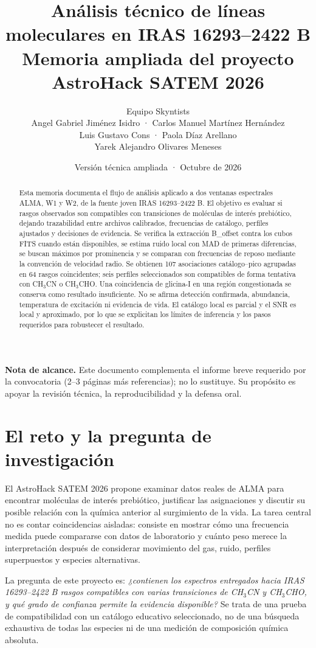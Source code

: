 \documentclass[10pt]{article}
\title{\vspace{-1.3em}\textbf{Análisis técnico de líneas moleculares en IRAS 16293--2422 B}\\[.35em]
\large Memoria ampliada del proyecto AstroHack SATEM 2026}
\author{Equipo Skyntists\\Angel Gabriel Jiménez Isidro · Carlos Manuel Martínez Hernández\\Luis Gustavo Cons · Paola Díaz Arellano\\\small Yarek Alejandro Olivares Meneses}
\date{Versión técnica ampliada · Octubre de 2026}
\begin{document}
\maketitle
\begin{abstract}
Esta memoria documenta el flujo de análisis aplicado a dos ventanas espectrales ALMA, W1 y W2, de la fuente joven IRAS 16293--2422 B. El objetivo es evaluar si rasgos observados son compatibles con transiciones de moléculas de interés prebiótico, dejando trazabilidad entre archivos calibrados, frecuencias de catálogo, perfiles ajustados y decisiones de evidencia. Se verifica la extracción B\_offset contra los cubos FITS cuando están disponibles, se estima ruido local con MAD de primeras diferencias, se buscan máximos por prominencia y se comparan con frecuencias de reposo mediante la convención de velocidad radio. Se obtienen 107 asociaciones catálogo--pico agrupadas en 64 rasgos coincidentes; seis perfiles seleccionados son compatibles de forma tentativa con CH$_3$CN o CH$_3$CHO. Una coincidencia de glicina-I en una región congestionada se conserva como resultado insuficiente. No se afirma detección confirmada, abundancia, temperatura de excitación ni evidencia de vida. El catálogo local es parcial y el SNR es local y aproximado, por lo que se explicitan los límites de inferencia y los pasos requeridos para robustecer el resultado.
\end{abstract}

\textbf{Nota de alcance.} Este documento complementa el informe breve requerido por la convocatoria (2--3 páginas más referencias); no lo sustituye. Su propósito es apoyar la revisión técnica, la reproducibilidad y la defensa oral.

\tableofcontents
\newpage

\section{El reto y la pregunta de investigación}
El AstroHack SATEM 2026 propone examinar datos reales de ALMA para encontrar moléculas de interés prebiótico, justificar las asignaciones y discutir su posible relación con la química anterior al surgimiento de la vida. La tarea central no es contar coincidencias aisladas: consiste en mostrar cómo una frecuencia medida puede compararse con datos de laboratorio y cuánto peso merece la interpretación después de considerar movimiento del gas, ruido, perfiles superpuestos y especies alternativas.

La pregunta de este proyecto es: \emph{¿contienen los espectros entregados hacia IRAS 16293--2422 B rasgos compatibles con varias transiciones de CH$_3$CN y CH$_3$CHO, y qué grado de confianza permite la evidencia disponible?} Se trata de una prueba de compatibilidad con un catálogo educativo seleccionado, no de una búsqueda exhaustiva de todas las especies ni de una medición de composición química absoluta.
\end{document}
